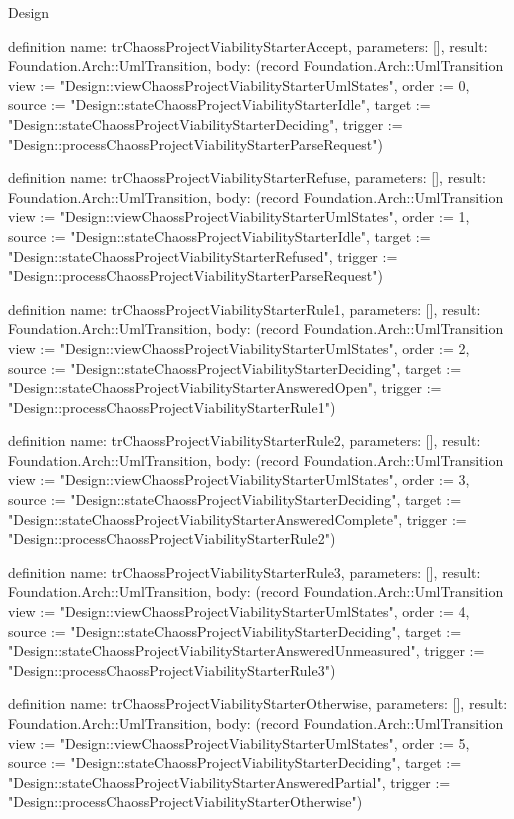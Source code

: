 \begin{lexlean}{Design}
\begin{semanticmodule}
definition{
  name: trChaossProjectViabilityStarterAccept,
  parameters: [],
  result: Foundation.Arch::UmlTransition,
  body: (record Foundation.Arch::UmlTransition {view := "Design::viewChaossProjectViabilityStarterUmlStates", order := 0, source := "Design::stateChaossProjectViabilityStarterIdle", target := "Design::stateChaossProjectViabilityStarterDeciding", trigger := "Design::processChaossProjectViabilityStarterParseRequest"})
}

definition{
  name: trChaossProjectViabilityStarterRefuse,
  parameters: [],
  result: Foundation.Arch::UmlTransition,
  body: (record Foundation.Arch::UmlTransition {view := "Design::viewChaossProjectViabilityStarterUmlStates", order := 1, source := "Design::stateChaossProjectViabilityStarterIdle", target := "Design::stateChaossProjectViabilityStarterRefused", trigger := "Design::processChaossProjectViabilityStarterParseRequest"})
}

definition{
  name: trChaossProjectViabilityStarterRule1,
  parameters: [],
  result: Foundation.Arch::UmlTransition,
  body: (record Foundation.Arch::UmlTransition {view := "Design::viewChaossProjectViabilityStarterUmlStates", order := 2, source := "Design::stateChaossProjectViabilityStarterDeciding", target := "Design::stateChaossProjectViabilityStarterAnsweredOpen", trigger := "Design::processChaossProjectViabilityStarterRule1"})
}

definition{
  name: trChaossProjectViabilityStarterRule2,
  parameters: [],
  result: Foundation.Arch::UmlTransition,
  body: (record Foundation.Arch::UmlTransition {view := "Design::viewChaossProjectViabilityStarterUmlStates", order := 3, source := "Design::stateChaossProjectViabilityStarterDeciding", target := "Design::stateChaossProjectViabilityStarterAnsweredComplete", trigger := "Design::processChaossProjectViabilityStarterRule2"})
}

definition{
  name: trChaossProjectViabilityStarterRule3,
  parameters: [],
  result: Foundation.Arch::UmlTransition,
  body: (record Foundation.Arch::UmlTransition {view := "Design::viewChaossProjectViabilityStarterUmlStates", order := 4, source := "Design::stateChaossProjectViabilityStarterDeciding", target := "Design::stateChaossProjectViabilityStarterAnsweredUnmeasured", trigger := "Design::processChaossProjectViabilityStarterRule3"})
}

definition{
  name: trChaossProjectViabilityStarterOtherwise,
  parameters: [],
  result: Foundation.Arch::UmlTransition,
  body: (record Foundation.Arch::UmlTransition {view := "Design::viewChaossProjectViabilityStarterUmlStates", order := 5, source := "Design::stateChaossProjectViabilityStarterDeciding", target := "Design::stateChaossProjectViabilityStarterAnsweredPartial", trigger := "Design::processChaossProjectViabilityStarterOtherwise"})
}


\end{semanticmodule}
\end{lexlean}
